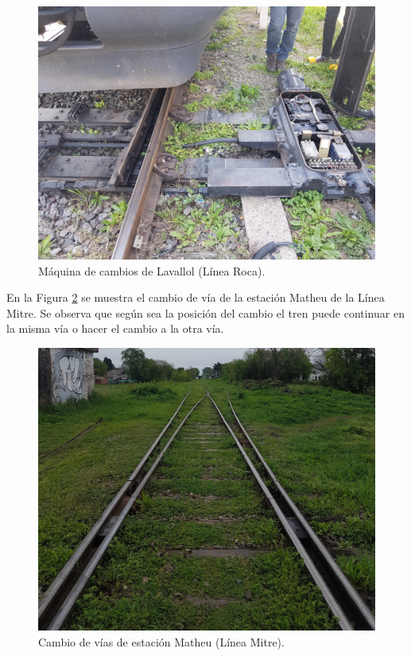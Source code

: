 			\begin{figure}[h!]
				\centering
				\includegraphics[scale=.06]{./Figures/Cambio}
				\caption{Máquina de cambios de Lavallol (Línea Roca).}
				\label{fig:Cambios}
			\end{figure} 
			
			\vspace{7cm}
			
			En la Figura \ref{fig:Cambios_2} se muestra el cambio de vía de la estación Matheu de la Línea Mitre. Se observa que según sea la posición del cambio el tren puede continuar en la misma vía o hacer el cambio a la otra vía.
			
			\begin{figure}[h!]
				\centering
				\includegraphics[scale=.1]{./Figures/Cambios_2}
				\caption{Cambio de vías de estación Matheu (Línea Mitre).}
				\label{fig:Cambios_2}
			\end{figure} 
		
